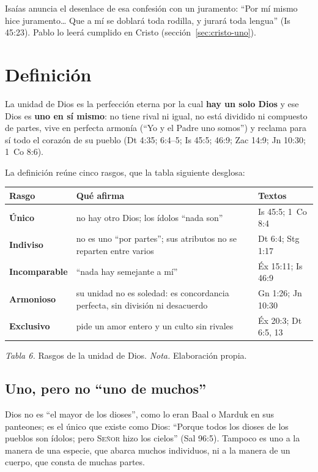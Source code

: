 \documentclass[11pt,letterpaper]{article}
\newcommand{\SENOR}{\textsc{Señor}}
\newcommand{\destacar}[1]{\textbf{\textcolor{azul}{#1}}}
\begin{document}
Isaías anuncia el desenlace de esa confesión con un juramento: ``Por mí mismo hice juramento\ldots{} Que a mí se doblará toda rodilla, y jurará toda lengua'' (Is 45:23). Pablo lo leerá cumplido en Cristo (sección~\ref{sec:cristo-uno}).

\section{Definición}

\begin{tcolorbox}[colback=papiro,colframe=azul,boxrule=1pt,arc=3pt]
La unidad de Dios es la perfección eterna por la cual \destacar{hay un solo Dios} y ese Dios es \destacar{uno en sí mismo}: no tiene rival ni igual, no está dividido ni compuesto de partes, vive en perfecta armonía (``Yo y el Padre uno somos'') y reclama para sí todo el corazón de su pueblo (Dt 4:35; 6:4--5; Is 45:5; 46:9; Zac 14:9; Jn 10:30; 1~Co 8:6).
\end{tcolorbox}

La definición reúne cinco rasgos, que la tabla siguiente desglosa:

\begin{center}\small\renewcommand{\arraystretch}{1.3}
\begin{tabular}{@{}L{2.6cm}L{8.0cm}L{3.8cm}@{}}
\toprule
\textbf{Rasgo} & \textbf{Qué afirma} & \textbf{Textos} \\ \midrule
\destacar{Único} & no hay otro Dios; los ídolos ``nada son'' & Is 45:5; 1~Co 8:4 \\
\destacar{Indiviso} & no es uno ``por partes''; sus atributos no se reparten entre varios & Dt 6:4; Stg 1:17 \\
\destacar{Incomparable} & ``nada hay semejante a mí'' & Éx 15:11; Is 46:9 \\
\destacar{Armonioso} & su unidad no es soledad: es concordancia perfecta, sin división ni desacuerdo & Gn 1:26; Jn 10:30 \\
\destacar{Exclusivo} & pide un amor entero y un culto sin rivales & Éx 20:3; Dt 6:5, 13 \\
\bottomrule
\end{tabular}\par
{\footnotesize\color{gris}\textit{Tabla 6.} Rasgos de la unidad de Dios. \textit{Nota.} Elaboración propia.}
\end{center}

\subsection{Uno, pero no ``uno de muchos''}
Dios no es ``el mayor de los dioses'', como lo eran Baal o Marduk en sus panteones; es el único que existe como Dios: ``Porque todos los dioses de los pueblos son ídolos; pero \SENOR{} hizo los cielos'' (Sal 96:5). Tampoco es uno a la manera de una especie, que abarca muchos individuos, ni a la manera de un cuerpo, que consta de muchas partes.
\end{document}
